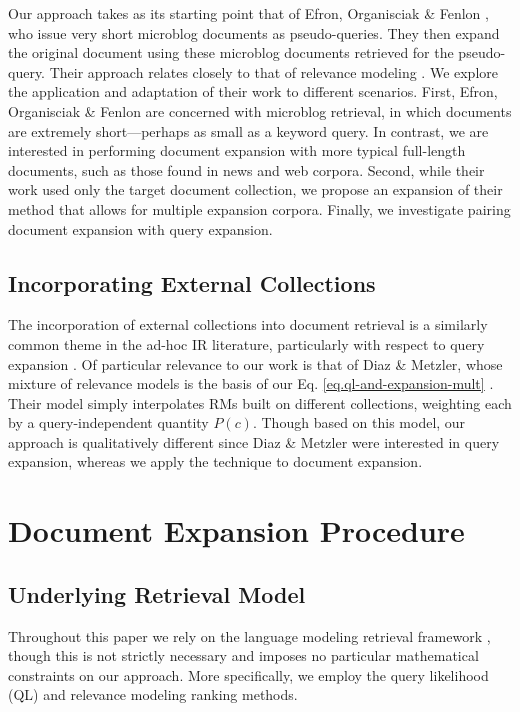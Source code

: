 \documentclass{sig-alternate}
\begin{document}
Our approach takes as its starting point that of Efron, Organisciak \& Fenlon \cite{Efron2012}, who issue very short microblog documents as pseudo-queries. They then expand the original document using these microblog documents retrieved for the pseudo-query. Their approach relates closely to that of relevance modeling \cite{Lavrenko2001}. We explore the application and adaptation of their work to different scenarios. First, Efron, Organisciak \& Fenlon are concerned with microblog retrieval, in which documents are extremely short---perhaps as small as a keyword query. In contrast, we are interested in performing document expansion with more typical full-length documents, such as those found in news and web corpora. Second, while their work used only the target document collection, we propose an expansion of their method that allows for multiple expansion corpora. Finally, we investigate pairing document expansion with query expansion.

\subsection{Incorporating External Collections}\label{section.external.collections}

The incorporation of external collections into document retrieval is a similarly common theme in the ad-hoc IR literature, particularly with respect to query expansion \cite{Diaz2006, Weerkamp2009, Li2007, Xu2009, Bendersky2012}. Of particular relevance to our work is that of Diaz \& Metzler, whose mixture of relevance models is the basis of our Eq. \ref{eq.ql-and-expansion-mult} \cite{Diaz2006}. Their model simply interpolates RMs built on different collections, weighting each by a query-independent quantity $P(c)$. Though based on this model, our approach is qualitatively different since Diaz \& Metzler were interested in query expansion, whereas we apply the technique to document expansion.

\section{Document Expansion Procedure}\label{section.expanding}

\subsection{Underlying Retrieval Model}\label{section.expanding.model}
Throughout this paper we rely on the language modeling retrieval framework \cite{Lafferty2001}, though this is not strictly necessary and imposes no particular mathematical constraints on our approach. More specifically, we employ the query likelihood (QL) and relevance modeling ranking methods. 
\end{document}
